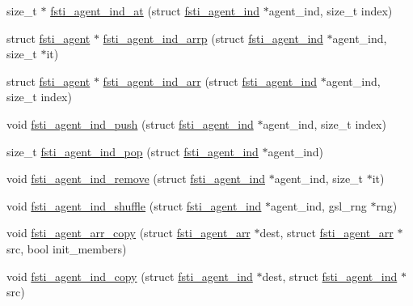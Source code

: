 \begin{DoxyCompactItemize}
size\+\_\+t $\ast$ \mbox{\hyperlink{fsti-agent_8c_a4c099994dc5a8cedc1de073fa64bfbcc}{fsti\+\_\+agent\+\_\+ind\+\_\+at}} (struct \mbox{\hyperlink{structfsti__agent__ind}{fsti\+\_\+agent\+\_\+ind}} $\ast$agent\+\_\+ind, size\+\_\+t index)
\item 
struct \mbox{\hyperlink{structfsti__agent}{fsti\+\_\+agent}} $\ast$ \mbox{\hyperlink{fsti-agent_8c_a0d3fcfadb1159b63508be133b30f8df7}{fsti\+\_\+agent\+\_\+ind\+\_\+arrp}} (struct \mbox{\hyperlink{structfsti__agent__ind}{fsti\+\_\+agent\+\_\+ind}} $\ast$agent\+\_\+ind, size\+\_\+t $\ast$it)
\item 
struct \mbox{\hyperlink{structfsti__agent}{fsti\+\_\+agent}} $\ast$ \mbox{\hyperlink{fsti-agent_8c_a0e45e82b7f4f019b1813daf04717b894}{fsti\+\_\+agent\+\_\+ind\+\_\+arr}} (struct \mbox{\hyperlink{structfsti__agent__ind}{fsti\+\_\+agent\+\_\+ind}} $\ast$agent\+\_\+ind, size\+\_\+t index)
\item 
void \mbox{\hyperlink{fsti-agent_8c_aeb0ffefe572b09e4e3d8e33571e256da}{fsti\+\_\+agent\+\_\+ind\+\_\+push}} (struct \mbox{\hyperlink{structfsti__agent__ind}{fsti\+\_\+agent\+\_\+ind}} $\ast$agent\+\_\+ind, size\+\_\+t index)
\item 
size\+\_\+t \mbox{\hyperlink{fsti-agent_8c_a40bb88f7ef7f1adc5b3bf76964f5ce03}{fsti\+\_\+agent\+\_\+ind\+\_\+pop}} (struct \mbox{\hyperlink{structfsti__agent__ind}{fsti\+\_\+agent\+\_\+ind}} $\ast$agent\+\_\+ind)
\item 
void \mbox{\hyperlink{fsti-agent_8c_a9005e4c20f02aff3ad90dafbaa630583}{fsti\+\_\+agent\+\_\+ind\+\_\+remove}} (struct \mbox{\hyperlink{structfsti__agent__ind}{fsti\+\_\+agent\+\_\+ind}} $\ast$agent\+\_\+ind, size\+\_\+t $\ast$it)
\item 
void \mbox{\hyperlink{fsti-agent_8c_ae598f299bc63165f2f0b5c9d5c72e52c}{fsti\+\_\+agent\+\_\+ind\+\_\+shuffle}} (struct \mbox{\hyperlink{structfsti__agent__ind}{fsti\+\_\+agent\+\_\+ind}} $\ast$agent\+\_\+ind, gsl\+\_\+rng $\ast$rng)
\item 
void \mbox{\hyperlink{fsti-agent_8c_a762cb927867ee04651d4464b300445de}{fsti\+\_\+agent\+\_\+arr\+\_\+copy}} (struct \mbox{\hyperlink{structfsti__agent__arr}{fsti\+\_\+agent\+\_\+arr}} $\ast$dest, struct \mbox{\hyperlink{structfsti__agent__arr}{fsti\+\_\+agent\+\_\+arr}} $\ast$src, bool init\+\_\+members)
\item 
void \mbox{\hyperlink{fsti-agent_8c_a6681f5dfe9ce93defe0d395774010080}{fsti\+\_\+agent\+\_\+ind\+\_\+copy}} (struct \mbox{\hyperlink{structfsti__agent__ind}{fsti\+\_\+agent\+\_\+ind}} $\ast$dest, struct \mbox{\hyperlink{structfsti__agent__ind}{fsti\+\_\+agent\+\_\+ind}} $\ast$src)

\end{DoxyCompactItemize}
